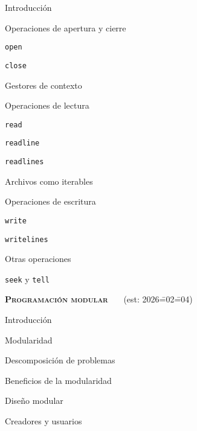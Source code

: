 \begin{longenum}
    \begin{longenum}
        \item Introducción
        \item Operaciones de apertura y cierre
        \begin{longenum}
            \item \texttt{open}
            \item \texttt{close}
            \item Gestores de contexto
        \end{longenum}
        \item Operaciones de lectura
        \begin{longenum}
            \item \texttt{read}
            \item \texttt{readline}
            \item \texttt{readlines}
            \item Archivos como iterables
        \end{longenum}
        \item Operaciones de escritura
        \begin{longenum}
            \item \texttt{write}
            \item \texttt{writelines}
        \end{longenum}
        \item Otras operaciones
        \begin{longenum}
            \item \texttt{seek} y \texttt{tell}
        \end{longenum}
    \end{longenum}
    \item \textbf{\textsc{Programación modular}} \ \ \ (est: 2026\==02\==04)
    \begin{longenum}
        \item Introducción
        \begin{longenum}
            \item Modularidad
            \item Descomposición de problemas
            \item Beneficios de la modularidad
        \end{longenum}
        \item Diseño modular
        \begin{longenum}
            \item Creadores y usuarios

\end{longenum}
\end{longenum}
\end{longenum}
